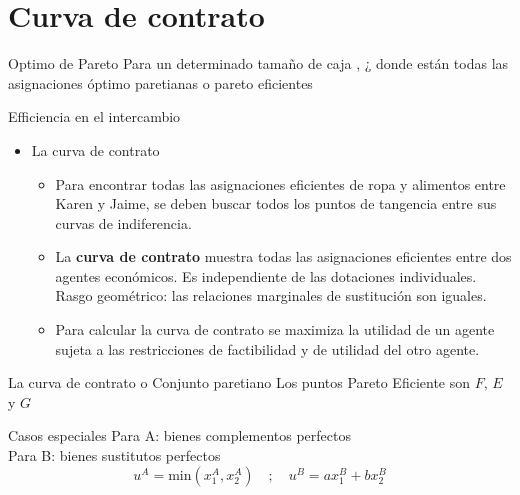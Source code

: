 \section[Contrato]{Curva de contrato}

\begin{frame}{Optimo de Pareto}
	Para un determinado tamaño de caja , ¿ donde están todas las asignaciones
	óptimo paretianas o pareto eficientes
\end{frame}
\begin{frame}{Efficiencia en el intercambio}
	\begin{itemize}
		\item La curva de contrato
			\begin{itemize}
				\item Para encontrar todas las asignaciones eficientes de ropa y alimentos entre Karen y Jaime, se deben buscar todos los puntos de tangencia entre sus curvas de indiferencia.
				\item La \textbf{curva de contrato} muestra todas las asignaciones eficientes entre dos agentes económicos. Es independiente de las dotaciones individuales. Rasgo geométrico: las relaciones marginales de sustitución son iguales.
				\item Para calcular la curva de contrato se maximiza la utilidad de un agente sujeta a las restricciones de factibilidad y de utilidad del otro agente.
			\end{itemize}
	\end{itemize}
\end{frame}
\begin{frame}{La curva de contrato o Conjunto paretiano}
		Los puntos Pareto Eficiente son $F$, $E$ y $G$\\
		\vspace{-0.6cm}
	
\end{frame}
\begin{frame}{Casos especiales}
	Para A: bienes complementos perfectos\\
	Para B: bienes sustitutos perfectos
		$$u^{A}=\text{min}(x_{1}^{A},x_{2}^{A}) \quad ; \quad u^{B}=ax_{1}^{B}+bx_{2}^{B}$$\\
			\centering
		
\end{frame}

